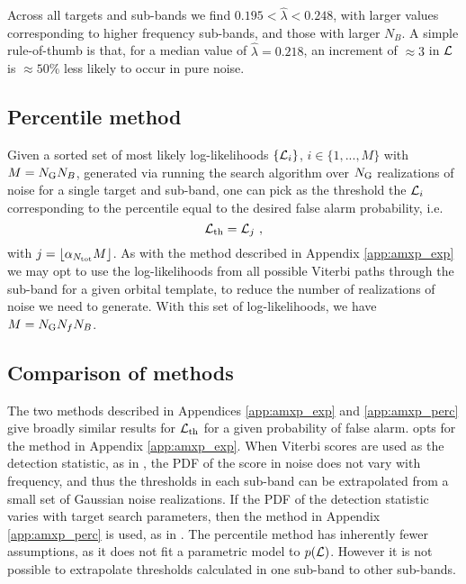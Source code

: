 \begin{subappendices}
Across all targets and sub-bands we find $0.195 < \hat{\lambda} < 0.248$, with larger values corresponding to higher frequency sub-bands, and those with larger $N_B$. A simple rule-of-thumb is that, for a median value of $\hat{\lambda}=0.218$, an increment of $\approx 3$ in $\mathcal{L}$ is $\approx 50\%$ less likely to occur in pure noise.

\subsection{Percentile method \label{app:amxp_perc}}
Given a sorted set of most likely log-likelihoods $\{\mathcal{L}_i\}$, $i \in \{1, ..., M\}$ with $M = N_{\rm G} N_B$, generated via running the search algorithm over $N_{\rm G}$ realizations of noise for a single target and sub-band, one can pick as the threshold the $\mathcal{L}_i$ corresponding to the percentile equal to the desired false alarm probability, i.e.
\begin{equation}
\mathcal{L}_{\rm th} = \mathcal{L}_{j}\ , \label{eq:amxp_lth_perc}
\end{equation}
with $j = \lfloor \alpha_{N_{\rm tot}} M \rfloor$. As with the method described in Appendix \ref{app:amxp_exp} we may opt to use the log-likelihoods from all possible Viterbi paths through the sub-band for a given orbital template, to reduce the number of realizations of noise we need to generate. With this set of log-likelihoods, we have $M=N_{\rm G}  N_f  N_B$. 

\subsection{Comparison of methods \label{app:amxp_whyth}}
The two methods described in Appendices \ref{app:amxp_exp} and \ref{app:amxp_perc} give broadly similar results for $\mathcal{L}_{\rm th}$ for a given probability of false alarm. \citet{o2vitsco} opts for the method in Appendix \ref{app:amxp_exp}. When Viterbi scores are used as the detection statistic, as in \citet{o2vitsco}, the PDF of the score in noise does not vary with frequency, and thus the thresholds in each sub-band can be extrapolated from a small set of Gaussian noise realizations. If the PDF of the detection statistic varies with target search parameters, then the method in Appendix \ref{app:amxp_perc} is used, as in \citet{Middleton2020, Millhouse2020, Jones2021, Beniwal2021}. The percentile method has inherently fewer assumptions, as it does not fit a parametric model to $p(\mathcal{L})$. However it is not possible to extrapolate thresholds calculated in one sub-band to other sub-bands. 


\end{subappendices}
